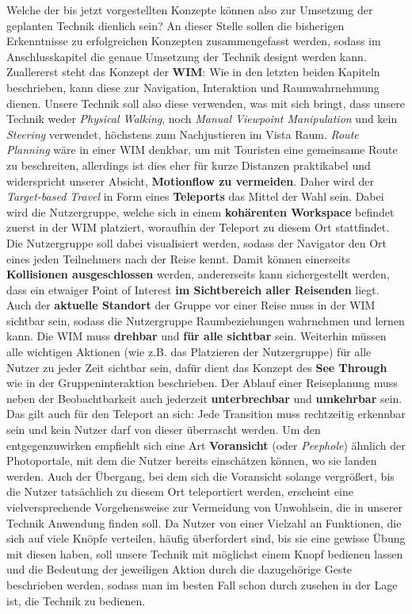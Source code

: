 Welche der bis jetzt vorgestellten Konzepte können also zur Umsetzung der geplanten Technik dienlich sein? An dieser Stelle sollen die bisherigen Erkenntnisse zu erfolgreichen Konzepten zusammengefasst werden, sodass im Anschlusskapitel die genaue Umsetzung der Technik designt werden kann.
Zuallererst steht das Konzept der \textbf{WIM}: Wie in den letzten beiden Kapiteln beschrieben, kann diese zur Navigation, Interaktion und Raumwahrnehmung dienen. 
Unsere Technik soll also diese verwenden, was mit sich bringt, dass unsere Technik weder \textit{Physical Walking}, noch \textit{Manual Viewpoint Manipulation} und kein \textit{Steering} verwendet, höchstens zum Nachjustieren im Vista Raum. \textit{Route Planning} wäre in einer WIM denkbar, um mit Touristen eine gemeinsame Route zu beschreiten, allerdings ist dies eher für kurze Distanzen praktikabel und widerspricht unserer Absicht, \textbf{Motionflow zu vermeiden}. Daher wird der \textit{Target-based Travel} in Form eines \textbf{Teleports} das Mittel der Wahl sein. Dabei wird die Nutzergruppe, welche sich in einem \textbf{kohärenten Workspace} befindet zuerst in der WIM platziert, woraufhin der Teleport zu diesem Ort stattfindet.
Die Nutzergruppe soll dabei visualisiert werden, sodass der Navigator den Ort eines jeden Teilnehmers nach der Reise kennt. Damit können einerseits \textbf{Kollisionen ausgeschlossen} werden, andererseits kann sichergestellt werden, dass ein etwaiger Point of Interest \textbf{im Sichtbereich aller Reisenden} liegt. Auch der \textbf{aktuelle Standort} der Gruppe vor einer Reise muss in der WIM sichtbar sein, sodass die Nutzergruppe Raumbeziehungen wahrnehmen und lernen kann. Die WIM muss \textbf{drehbar} und \textbf{für alle sichtbar} sein.  Weiterhin müssen alle wichtigen Aktionen (wie z.B. das Platzieren der Nutzergruppe) für alle Nutzer zu jeder Zeit sichtbar sein, dafür dient das Konzept des \textbf{See Through} wie in der Gruppeninteraktion beschrieben.
Der Ablauf einer Reiseplanung muss neben der Beobachtbarkeit auch jederzeit \textbf{unterbrechbar} und \textbf{umkehrbar} sein. Das gilt auch für den Teleport an sich: Jede Transition muss rechtzeitig erkennbar sein und kein Nutzer darf von dieser überrascht werden.
Um den entgegenzuwirken empfiehlt sich eine Art \textbf{Voransicht} (oder \textit{Peephole}) ähnlich der Photoportale, mit dem die Nutzer bereits einschätzen können, wo sie landen werden. Auch der Übergang, bei dem sich die Voransicht solange vergrößert, bis die Nutzer tatsächlich zu diesem Ort teleportiert werden, erscheint eine vielversprechende Vorgehensweise zur Vermeidung von Unwohlsein, die in unserer Technik Anwendung finden soll.
Da Nutzer von einer Vielzahl an Funktionen, die sich auf viele Knöpfe verteilen, häufig überfordert sind, bis sie eine gewisse Übung mit diesen haben, soll unsere Technik mit möglichst einem Knopf bedienen lassen und die Bedeutung der jeweiligen Aktion durch die dazugehörige Geste beschrieben werden, sodass man im besten Fall schon durch zusehen in der Lage ist, die Technik zu bedienen.


